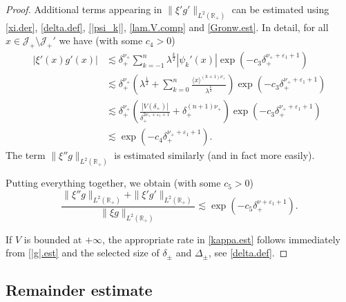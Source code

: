 \begin{proof}
Additional terms appearing in $\|\xi' g'\|_{L^2({\mathbb{R}}_+)}$ can be estimated using \eqref{xi.der}, \eqref{delta.def}, \eqref{|psi_k|}, \eqref{lam.V.comp} and \eqref{Gronw.est}. In detail, for all $x \in {\mathcal J}_+ \setminus {\mathcal J}_+'$ we have (with some $c_4>0$) 
\begin{equation}
\begin{aligned}
|\xi'(x) g'(x)| &
{\lesssim}  
\delta_+^{\nu_+} 
\sum_{k=-1}^n \lambda^\frac k2|\psi_k'(x)|
\exp(- c_3 \delta_+^{\nu_+ + {\varepsilon}_1+1})
\\
&{\lesssim} \delta_+^{\nu_+} \left(\lambda^\frac12 + \sum_{k=0}^n \frac{\langle x \rangle^{(k+1)\nu_+}}{\lambda^\frac k2} \right) \exp(- c_3 \delta_+^{\nu_+ + {\varepsilon}_1+1})
\\
&{\lesssim} \delta_+^{\nu_+}  \left( \frac{|V(\delta_+)|}{\delta_+^{2\nu_+ +{\varepsilon}_1 +1}}  + \delta_+^{(n+1)\nu_+} \right)
\exp(- c_3 \delta_+^{\nu_+ + {\varepsilon}_1+1})
\\
& {\lesssim} \exp(- c_4 \delta_+^{\nu_+ + {\varepsilon}_1+1}).
\end{aligned}
\end{equation}
The term $\|\xi'' g\|_{L^2({\mathbb{R}}_+)}$ is estimated similarly
(and in fact more easily).

Putting everything together, we obtain (with some $c_5>0$)
\begin{equation}
\frac{\|\xi'' g\|_{L^2({\mathbb{R}}_+)} + \|\xi' g'\|_{L^2({\mathbb{R}}_+)}}{\|\xi g\|_{L^2({\mathbb{R}}_+)}} 
{\lesssim}
\exp(- c_5 \delta_+^{\nu+{\varepsilon}_1+1}).
\end{equation}

If $V$ is bounded at $+\infty$, the appropriate rate in \eqref{kappa.est} follows immediately from \eqref{|g|.est} and the selected size of $\delta_\pm$ and $\Delta_\pm$, see \eqref{delta.def}. 
\end{proof}

\subsection{Remainder estimate}
\label{subsec:rem.unbdd}

